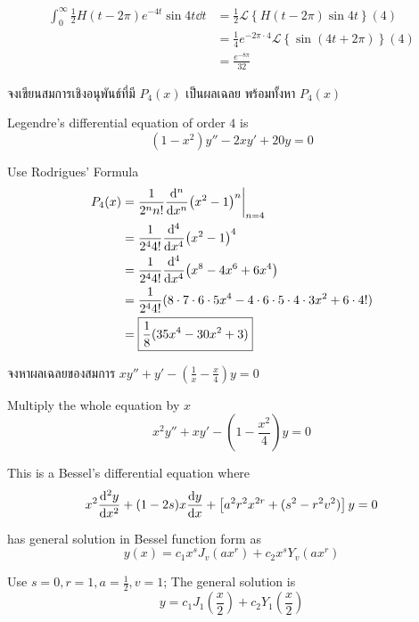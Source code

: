 \documentclass[12pt,final]{novelette} %
\begin{document}
\begin{question}
\begin{question}
        \begin{align*}
            \int_0^\infty \frac12 H(t-2\pi) e^{-4t} \sin 4t \dd{t} & = \frac12 \mathcal{L}\left\{H(t-2\pi) \sin 4t \right\}(4)                \\
                                                                   & = \frac14 e^{-2\pi \cdot 4} \mathcal{L}\left\{\sin(4t + 2\pi)\right\}(4) \\
                                                                   & = \boxed{\frac{e^{-8\pi}}{32}}
        \end{align*}

    \end{question}

    \item {}
    จงเขียนสมการเชิงอนุพันธ์ที่มี $P_4(x)$ เป็นผลเฉลย พร้อมทั้งหา $P_4(x)$ 

    \bigskip
    Legendre's differential equation of order $4$ is
    $$
        \boxed{(1-x^2)y'' - 2xy' + 20y = 0}
    $$

    Use Rodrigues' Formula
    \begin{align*}
        P_4(x) & = \frac{1}{2^n n!} \dv[n]{x} (x^2 - 1)^n \bigg|_{n=4}                                   \\
               & = \frac{1}{2^4 4!} \dv[4]{x} (x^2 - 1)^4                                                \\
               & = \frac{1}{2^4 4!} \dv[4]{x} (x^8 - 4x^6 + 6x^4)                                        \\
               & = \frac{1}{2^4 4!} (8\cdot7\cdot6\cdot5 x^4 - 4\cdot6\cdot5\cdot4\cdot3 x^2 + 6\cdot4!) \\
               & = \boxed{\frac{1}{8} (35x^4 - 30x^2 + 3)}
    \end{align*}

    \item {}
    จงหาผลเฉลยของสมการ $\displaystyle xy'' + y' - \left(\frac1x - \frac x4\right)y = 0$ 

    \bigskip
    Multiply the whole equation by $x$
    $$
        x^2 y'' + xy' - \left(1 - \frac {x^2}4\right) y = 0
    $$

    This is a Bessel's differential equation where
    $$
        x^2 \dv[2]{y}{x} + (1 - 2s) x \dv{y}{x} + \left[a^2r^2x^{2r} + (s^2 - r^2v^2)\right] y =0
    $$

    has general solution in Bessel function form as
    $$
        y(x) = c_1 x^s J_v(ax^r) + c_2 x^s Y_v(ax^r)
    $$

    Use $s = 0, r = 1, a = \frac12, v = 1$; The general solution is
    $$
        \boxed{y = c_1 J_1\left(\frac x2\right) + c_2 Y_1\left(\frac x2\right)}
    $$


\end{question}
\end{document}
